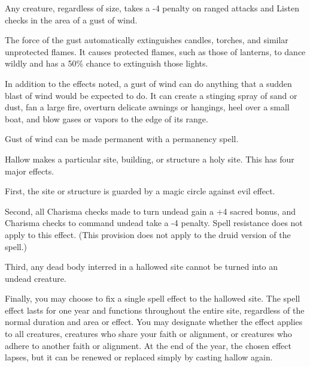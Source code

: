 \begin{multicols}{2}
\begin{small}
\smallskip\noindent Any creature, regardless of size, takes a -4 penalty on ranged attacks and Listen checks in the area of a gust of wind.

\smallskip\noindent The force of the gust automatically extinguishes candles, torches, and similar unprotected flames. It causes protected flames, such as those of lanterns, to dance wildly and has a 50\% chance to extinguish those lights.

\smallskip\noindent In addition to the effects noted, a gust of wind can do anything that a sudden blast of wind would be expected to do. It can create a stinging spray of sand or dust, fan a large fire, overturn delicate awnings or hangings, heel over a small boat, and blow gases or vapors to the edge of its range.

\smallskip\noindent Gust of wind can be made permanent with a permanency spell.

\noindent Hallow makes a particular site, building, or structure a holy site. This has four major effects.

\smallskip\noindent First, the site or structure is guarded by a magic circle against evil effect.

\smallskip\noindent Second, all Charisma checks made to turn undead gain a +4 sacred bonus, and Charisma checks to command undead take a -4 penalty. Spell resistance does not apply to this effect. (This provision does not apply to the druid version of the spell.)

\smallskip\noindent Third, any dead body interred in a hallowed site cannot be turned into an undead creature.

\smallskip\noindent Finally, you may choose to fix a single spell effect to the hallowed site. The spell effect lasts for one year and functions throughout the entire site, regardless of the normal duration and area or effect. You may designate whether the effect applies to all creatures, creatures who share your faith or alignment, or creatures who adhere to another faith or alignment. At the end of the year, the chosen effect lapses, but it can be renewed or replaced simply by casting hallow again.


\end{small}
\end{multicols}
